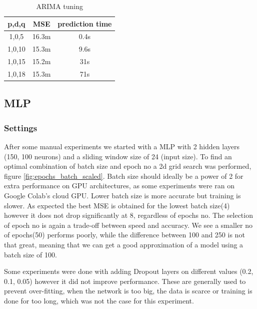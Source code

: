 \documentclass[12pt]{article}
\begin{document}
\begin{table}[htbp]
\caption{ARIMA tuning}
\begin{center}
\begin{tabular}{|c|c|c|}
\hline
p,d,q & MSE & prediction time \\
\hline
1,0,5 & 16.3m & 0.4s\\
\hline
1,0,10 & 15.3m & 9.6s\\
\hline
1,0,15 & 15.2m & 31s\\
\hline
1,0,18 & 15.3m & 71s\\
\hline
\end{tabular}
\label{tab:arima_sesults}
\end{center}
\end{table}

\subsection{MLP}

\subsubsection{Settings}
After some manual experiments we started with a MLP with 2 hidden layers (150, 100 neurons) and a sliding window size of 24 (input size). To find an optimal combination of batch size and epoch no a 2d grid search was performed, figure \ref{fig:epochs_batch_scaled}. Batch size should ideally be a power of 2 for extra performance on GPU architectures, as some experiments were ran on Google Colab's cloud GPU. Lower batch size is more accurate but training is slower\cite{batch_size}. As expected the best MSE is obtained for the lowest batch size(4) however it does not drop significantly at 8, regardless of epochs no. The
selection of epoch no is again a trade-off between speed and accuracy. We see a smaller no of epochs(50) performs poorly, while the difference between 100 and 250 is not that great,
meaning that we can get a good approximation of a model using a batch size of 100.

Some experiments were done with adding Dropout layers on different values (0.2, 0.1, 0.05) however it did not improve performance. These are generally used to prevent over-fitting, when the network is too big, the data is scarce or training is done for too long\cite{dropout}, which was not the case for this experiment.
\end{document}
